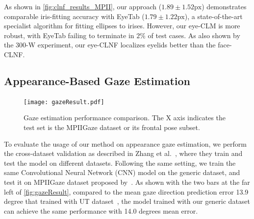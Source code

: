 As shown in \autoref{fig:clnf_results_MPII}, our approach ($1.89\!\pm\!1.52\textrm{px}$) demonstrates comparable iris-fitting accuracy with EyeTab ($1.79\!\pm\!1.22\textrm{px}$), a state-of-the-art specialist algorithm for fitting ellipses to irises. However, our eye-CLM is more robust, with EyeTab failing to terminate in $2\%$ of test cases. As also shown by the 300-W experiment, our eye-CLNF localizes eyelids better than the face-CLNF.



\subsection{Appearance-Based Gaze Estimation}





\begin{figure}
    \centering
    \texttt{[image: gazeResult.pdf]}
    \caption{Gaze estimation performance comparison. The X axis indicates the test set is the MPIIGaze dataset or its frontal pose subset.}
    \label{fig:gazeResult}
\end{figure}

To evaluate the usage of our method on appearance gaze estimation, we perform the cross-dataset validation as described in Zhang et al.~\cite{zhang15_cvpr}, where they train and test the model on different datasets. Following the same setting, we train the same Convolutional Neural Network (CNN) model on the generic \dataset dataset, and test it on MPIIGaze dataset proposed by~\cite{zhang15_cvpr}. As shown with the two bars at the far left of \autoref{fig:gazeResult}, compared to the mean gaze direction prediction error 13.9 degree that trained with UT dataset~\cite{sugano2014learning}, the model trained with our generic \dataset dataset can achieve the same performance with 14.0 degrees mean error.

